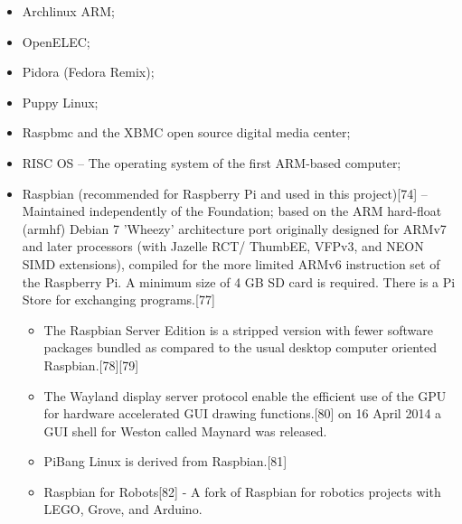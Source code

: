 \documentclass{acm_proc_article-sp}
\begin{document}
\begin{itemize}

\item Archlinux ARM;
\item OpenELEC;
\item Pidora (Fedora Remix);
\item Puppy Linux;
\item Raspbmc and the XBMC open source digital media center;
\item RISC OS – The operating system of the first ARM-based computer;
\item Raspbian (recommended for Raspberry Pi and used in this project)[74] – Maintained independently of the Foundation; based on the ARM hard-float (armhf) Debian 7 'Wheezy' architecture port originally designed for ARMv7 and later processors (with Jazelle RCT/ ThumbEE, VFPv3, and NEON SIMD extensions), compiled for the more limited ARMv6 instruction set of the Raspberry Pi. A minimum size of 4 GB SD card is required. There is a Pi Store for exchanging programs.[77]
\begin{itemize}
\item The Raspbian Server Edition is a stripped version with fewer software packages bundled as compared to the usual desktop computer oriented Raspbian.[78][79]
\item The Wayland display server protocol enable the efficient use of the GPU for hardware accelerated GUI drawing functions.[80] on 16 April 2014 a GUI shell for Weston called Maynard was released.
\item PiBang Linux is derived from Raspbian.[81]
\item Raspbian for Robots[82] - A fork of Raspbian for robotics projects with LEGO, Grove, and Arduino.
\end{itemize}
\end{itemize}
\end{document}
